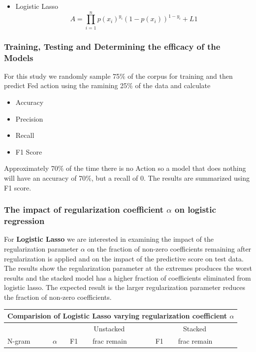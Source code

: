 \documentclass[11pt]{article}
\begin{document}
{\begin{itemize}
\item Logistic Lasso
\begin{equation*}
A = \prod_{i=1}^n p(x_i)^{y_i}(1-p(x_i))^{1-y_i}+ L1
\end{equation*}
\end{itemize}

\subsubsection{Training, Testing and Determining the efficacy of the Models}
For this study we randomly sample 75$\%$ of the corpus for training and then 
predict Fed action using the ramining 25$\%$ of the data and calculate
\begin{itemize}
\item Accuracy
\item Precision
\item Recall
\item F1 Score
\end{itemize}
Approximately 70$\%$ of the time there is no Action so a model that does nothing will
have an accuracy of 70$\%$, but a recall of 0.  The results are summarized using F1
score.

\subsubsection{The impact of regularization coefficient $\alpha$ on logistic regression}
\noindent 
For \textbf{Logistic Lasso} we are interested in examining the impact of the regularization parameter $\alpha$ on
the fraction of  non-zero coefficients remaining after regularization is applied and on the impact of the predictive
score on test data. The results show the regularization parameter at the extremes produces the worst results
and the stacked model has a higher fraction of coefficients eliminated from logistic lasso. The expected result
is the larger regularization parameter reduces the fraction of non-zero coefficients.\\

\noindent \begin{tabular}{ |p{2cm}||p{2cm}|p{2cm}|p{2cm}|p{2cm}|p{2cm}|  }
 \hline
 \multicolumn{6}{|c|}{Comparision of Logistic Lasso varying regularization coefficient $\alpha$} \\
 \hline
 \multicolumn{1}{|c|}{} &
 \multicolumn{1}{|c|}{} &
 \multicolumn{2}{|c|}{Unstacked} &
 \multicolumn{2}{|c|}{Stacked}\\
 \hline
 N-gram & $\alpha$ & F1 & frac remain & F1 & frac remain\\
 \hline


\end{tabular}}
\end{document}
